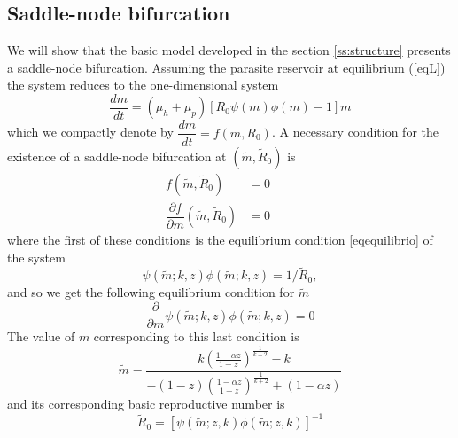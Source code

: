 \documentclass[12pt,a4paper]{article}
\theoremstyle{plain}%
\theoremstyle{definition}
\theoremstyle{remark}
\begin{document}
		
\subsection{Saddle-node bifurcation}\label{bifurcacion}
We will show that the basic model developed in the section \ref{ss:structure} presents a saddle-node bifurcation. Assuming the parasite reservoir at equilibrium (\ref{eqL})  the system reduces to the one-dimensional system 
\begin{equation*}
\dfrac{dm}{dt}=(\mu_h + \mu_p)\left[ R_0  \psi(m)\phi(m) -1 \right] m%
\end{equation*}
which we compactly denote by
$\dfrac{dm}{dt}=f(m,R_0)$.
A necessary condition for the existence of a saddle-node bifurcation at 
$(\tilde m,\tilde R_0)$ is
\begin{equation}
\begin{split}
f(\tilde m,\tilde R_0)&=0\qquad\\
\dfrac{\partial f}{\partial m}(\tilde m,\tilde R_0)&=0
\end{split}
\end{equation}
where the first of these conditions is the equilibrium condition \eqref{eqequilibrio} of the system
\begin{equation*}
\psi(\tilde m;k,z)\phi(\tilde m;k,z)=1/\tilde R_0,
\end{equation*}
and so we get the following equilibrium condition for $\tilde m$
\begin{equation}
\frac{\partial }{\partial m}\psi(\tilde m;k,z)\phi(\tilde m;k,z)=0	
\end{equation}
The value of $m$ corresponding to this last condition is
\begin{equation}
\tilde m=\dfrac{k\left( \frac{1-\alpha z}{1-z}\right)^{\frac{1}{k+2}} - k}{-(1-z)\left( \frac{1-\alpha z}{1-z}\right)^{\frac{1}{k+2}} + (1-\alpha z)}	
\end{equation}
and its corresponding basic reproductive number is
\begin{equation}
\tilde R_0=\left[ \psi(\tilde m;z,k)\phi(\tilde m;z,k)\right]^{-1}
\end{equation}	
 
\end{document}
